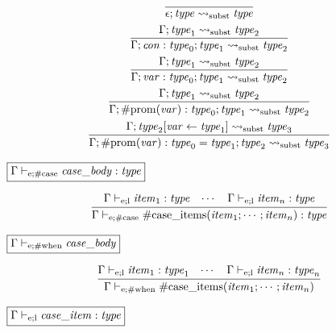 \begin{gather*}
    \infer{\epsilon; \mathit{type} \rightsquigarrow_\mathrm{subst} \mathit{type}}{}
    \\
    \infer{\Gamma; \mathit{con}: \mathit{type}_0; \mathit{type}_1 \rightsquigarrow_\mathrm{subst} \mathit{type}_2}{
        \Gamma; \mathit{type}_1 \rightsquigarrow_\mathrm{subst} \mathit{type}_2
    }
    \\
    \infer{\Gamma; \mathit{var}: \mathit{type}_0; \mathit{type}_1 \rightsquigarrow_\mathrm{subst} \mathit{type}_2}{
        \Gamma; \mathit{type}_1 \rightsquigarrow_\mathrm{subst} \mathit{type}_2
    }
    \\
    \infer{\Gamma; \mathrm{\#prom}(\mathit{var}): \mathit{type}_0; \mathit{type}_1 \rightsquigarrow_\mathrm{subst} \mathit{type}_2}{
        \Gamma; \mathit{type}_1 \rightsquigarrow_\mathrm{subst} \mathit{type}_2
    }
    \\
    \infer{\Gamma; \mathrm{\#prom}(\mathit{var}): \mathit{type}_0 = \mathit{type}_1; \mathit{type}_2 \rightsquigarrow_\mathrm{subst} \mathit{type}_3}{
        \Gamma; \mathit{type}_2[\mathit{var} \assign \mathit{type}_1] \rightsquigarrow_\mathrm{subst} \mathit{type}_3
    }
\end{gather*}

$\fbox{$\Gamma \vdash_{\mathrm{e}; \mathrm{\#case}} \mathit{case\_body}: \mathit{type}$}$

\begin{gather*}
    \infer{\Gamma \vdash_{\mathrm{e}; \mathrm{\#case}} \mathrm{\#case\_items}(\mathit{item}_1; \cdots; \mathit{item}_n): \mathit{type}}{
        \Gamma \vdash_{\mathrm{e}; \mathrm{l}} \mathit{item}_1: \mathit{type}
        &
        \cdots
        &
        \Gamma \vdash_{\mathrm{e}; \mathrm{l}} \mathit{item}_n: \mathit{type}
    }
\end{gather*}

$\fbox{$\Gamma \vdash_{\mathrm{e}; \mathrm{\#when}} \mathit{case\_body}$}$

\begin{gather*}
    \infer{\Gamma \vdash_{\mathrm{e}; \mathrm{\#when}} \mathrm{\#case\_items}(\mathit{item}_1; \cdots; \mathit{item}_n)}{
        \Gamma \vdash_{\mathrm{e}; \mathrm{l}} \mathit{item}_1: \mathit{type}_1
        &
        \cdots
        &
        \Gamma \vdash_{\mathrm{e}; \mathrm{l}} \mathit{item}_n: \mathit{type}_n
    }
\end{gather*}

$\fbox{$\Gamma \vdash_{\mathrm{e}; \mathrm{l}} \mathit{case\_item}: \mathit{type}$}$

